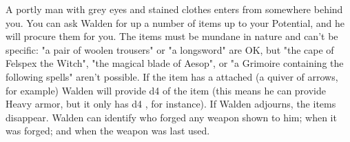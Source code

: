 {

A portly man with grey eyes and stained clothes enters from somewhere behind you.  You can ask Walden for up a number of items up to your Potential, and he will procure them for you.  The items must be mundane in nature and can't be specific:  "a pair of woolen trousers" or "a longsword" are OK, but "the cape of Felspex the Witch", "the magical blade of Aesop", or "a Grimoire containing the following spells" aren't possible.  If the item has a \UD attached (a quiver of arrows, for example) Walden will provide d4 \UD of the item (this means he can provide Heavy armor, but it only has d4 \UD, for instance).  If Walden adjourns, the items disappear.  Walden can identify who forged any weapon shown to him; when it was forged; and when the weapon was last used.







}%

